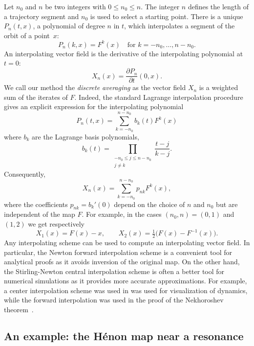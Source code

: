 \documentclass[a4paper,12pt]{article}
\begin{document}
Let $n_0$ and $n$ be two integers with $0\le n_0\le n$. The integer $n$
defines the length of a trajectory segment and $n_0$ is used to select
a starting point. 
There is a unique $P_n(t,x)$, 
a polynomial of degree $n$ in $t$,
which interpolates a segment of the orbit of a point~$x$:
\begin{equation}\label{Eq:interpol}
P_n(k,x)=F^k(x)\quad\mbox{for $k=-n_0,\ldots,n-n_0$}.
\end{equation}
An interpolating vector field is the derivative of the interpolating polynomial at $t=0$:
\begin{equation}\label{Eq:Xn}
X_{n}(x)=\frac{\partial P_n}{\partial t}(0,x).
\end{equation}
We call our method the {\em discrete averaging} as the vector field $X_n$
is a weighted sum of the iterates of $F$. Indeed, 
the standard Lagrange interpolation procedure 
gives an explicit expression for the interpolating polynomial
\begin{equation}\label{Eq:LagrangeInterpol}
   P_n(t,x)=\sum_{k=-n_0}^{n-n_0}b_k(t)F^k(x) 
\end{equation}
where 
$b_k$ are the Lagrange basis polynomials,
\[
b_k(t)=\prod_{\substack {-n_0\le j \le n-n_0\\ j\ne k}}\frac{t-j}{k-j}.
\]
Consequently,
\begin{equation}\label{Eq:Xn_averaging}
X_{n}(x)=\sum_{k=-n_0}^{n-n_0}p_{nk}F^k(x)
,
\end{equation}
where the coefficients $p_{nk}=b_k'(0)$ depend on the choice of $n$ and $n_0$ but are independent of   the map $F$.
For example, in the cases $(n_0,n)=(0,1)$ and $(1,2)$ we get respectively
\begin{equation}\label{Eq:examples1-2}
X_1(x)=F(x)-x,\qquad X_2(x)=\tfrac12\bigl(F(x)-F^{-1}(x)\bigr).
\end{equation}
Any interpolating scheme
can be used to compute an interpolating vector field.
In particular, the Newton forward interpolation
scheme is a convenient tool for analytical proofs as it avoids inversion of the original map. 
On the other hand,  the Stirling-Newton central interpolation scheme
is often a 
better tool for numerical simulations as it provides more accurate approximations. 
For example, a center interpolation scheme
was used in \cite{GelfreichV18} was used for visualization of dynamics, while the forward interpolation was used
in the proof of the Nekhoroshev theorem~\cite{GelfreichV26}.




\subsection{An example: the Hénon map near a resonance\label{Se:henon}}
\end{document}
